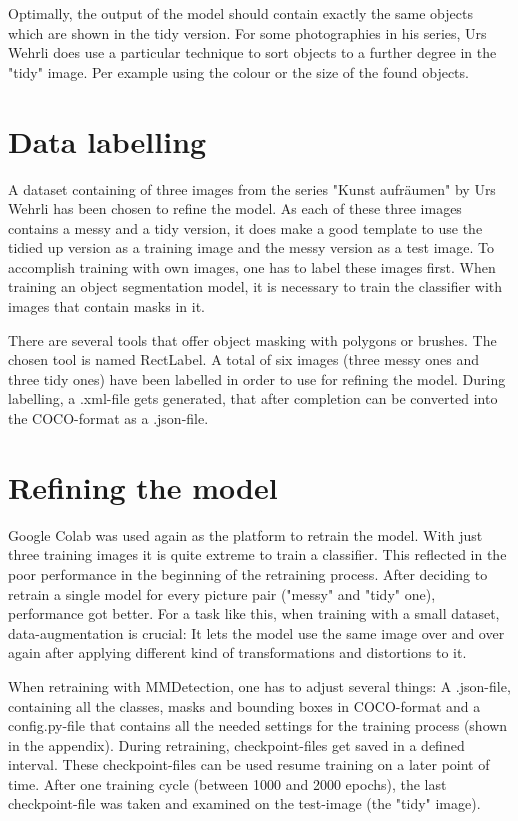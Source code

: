 Optimally, the output of the model should contain exactly the same objects which are shown in the tidy version. For some photographies in his series, Urs Wehrli does use a particular technique to sort objects to a further degree in the "tidy" image. Per example using the colour or the size of the found objects.

\section{Data labelling}

A dataset containing of three images from the series "Kunst aufräumen" by Urs Wehrli has been chosen to refine the model. As each of these three images contains a messy and a tidy version, it does make a good template to use the tidied up version as a training image and the messy version as a test image. To accomplish training with own images, one has to label these images first. When training an object segmentation model, it is necessary to train the classifier with images that contain masks in it.

There are several tools that offer object masking with polygons or brushes. The chosen tool is named RectLabel. A total of six images (three messy ones and three tidy ones) have been labelled in order to use for refining the model. During labelling, a .xml-file gets generated, that after completion can be converted into the COCO-format as a .json-file.

\section{Refining the model}
\label{refining-the-model}

Google Colab was used again as the platform to retrain the model. With just three training images it is quite extreme to train a classifier. This reflected in the poor performance in the beginning of the retraining process. After deciding to retrain a single model for every picture pair ("messy" and "tidy" one), performance got better. For a task like this, when training with a small dataset, data-augmentation is crucial: It lets the model use the same image over and over again after applying different kind of transformations and distortions to it.

When retraining with MMDetection, one has to adjust several things: A .json-file, containing all the classes, masks and bounding boxes in COCO-format and a config.py-file that contains all the needed settings for the training process (shown in the appendix). During retraining, checkpoint-files get saved in a defined interval. These checkpoint-files can be used resume training on a later point of time. After one training cycle (between 1000 and 2000 epochs), the last checkpoint-file was taken and examined on the test-image (the "tidy" image).
